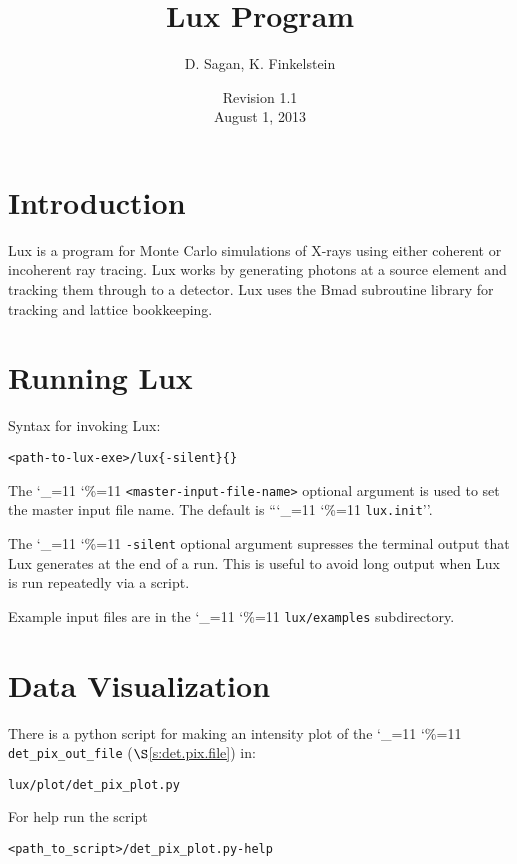 \documentclass[11pt]{article}
\title{Lux Program}
\author{D. Sagan, K. Finkelstein}
\date{Revision 1.1 \\ August 1, 2013}
\newcommand{\lux}{Lux\xspace}
\newcommand\ttcmd{\begingroup\catcode`\_=11 \catcode`\%=11 \dottcmd}
\newcommand\dottcmd[1]{\texttt{#1}\endgroup}
\newcommand{\vn}{\ttcmd}
\newcommand{\sref}[1]{$\S$\ref{#1}}
\newenvironment{example}
  {\vspace{\ExBeg} \begin{alltt}}
  {\end{alltt} \vspace{\ExEnd}}
\newlength{\ExBeg}
\newlength{\ExEnd}
\begin{document}
\maketitle

\tableofcontents

\section{Introduction} 
\label{s:intro}

\lux is a program for Monte Carlo simulations of X-rays using either
coherent or incoherent ray tracing. \lux works by generating
photons at a source element and tracking them through to a
detector. \lux uses the Bmad subroutine library\cite{b:bmad} for
tracking and lattice bookkeeping.

\section{Running \lux} 
\label{s:run}

Syntax for invoking \lux:
\begin{example}
 <path-to-lux-exe>/lux \{-silent\} \{<master-input-file-name>\}
\end{example}
The \vn{<master-input-file-name>} optional argument is used to set the
master input file name. The default is ``\vn{lux.init}''. 

The \vn{-silent} optional argument supresses the terminal output that
\lux generates at the end of a run. This is useful to avoid long
output when \lux is run repeatedly via a script.

Example input files are in the \vn{lux/examples} subdirectory.

\section{Data Visualization}
\label{s:vis}

There is a python script for making an intensity plot of the
\vn{det_pix_out_file} (\sref{s:det.pix.file}) in:
\begin{example}
  lux/plot/det_pix_plot.py
\end{example}
For help run the script
\begin{example}
  <path_to_script>/det_pix_plot.py -help
\end{example}
\end{document}
